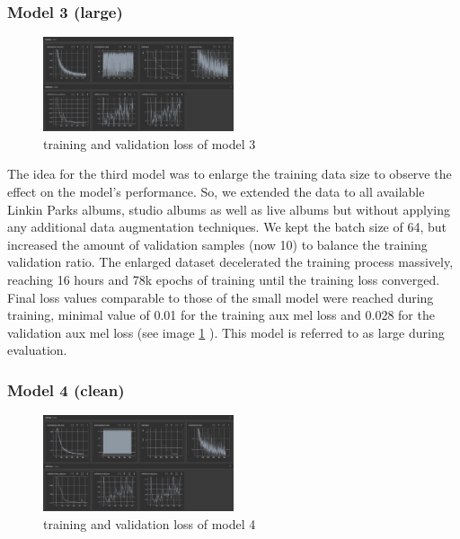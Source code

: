 \documentclass[a4paper]{article}
\begin{document}
	
	\subsubsection{Model 3 (large)}
	
	\begin{figure}[htbp]
		\centering
		\includegraphics[width=0.5\textwidth]{graphics/v3_training+testing.png}
		\caption{training and validation loss of model 3}
		\label{fig:model3}
	\end{figure}
	
	The idea for the third model was to enlarge the training data size to observe the effect on the model’s performance. So, we extended the data to all available Linkin Parks albums, studio albums as well as live albums but without applying any additional data augmentation techniques. We kept the batch size of 64, but increased the amount of validation samples (now 10) to balance the training validation ratio. The enlarged dataset decelerated the training process massively, reaching 16 hours and 78k epochs of training until the training loss converged. Final loss values comparable to those of the small model were reached during training, minimal value of 0.01 for the training aux mel loss and 0.028 for the validation aux mel loss (see image \ref{fig:model3} ). This model is referred to as large during evaluation. 

	
	\subsubsection{Model 4 (clean)}
	
	\begin{figure}[htbp]
		\centering
		\includegraphics[width=0.5\textwidth]{graphics/v4_training+testing.png}
		\caption{training and validation loss of model 4}
		\label{fig:model4}
	\end{figure}
	
\end{document}
